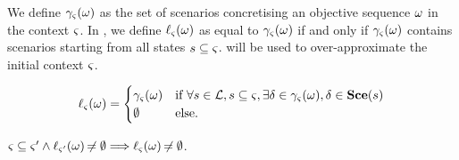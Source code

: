 We define $\gamma_\varsigma(\omega)$ as the set of scenarios concretising an objective sequence $\omega$ in the context $\varsigma$.
In , we define $\ell_\varsigma(\omega)$ as equal to $\gamma_\varsigma(\omega)$ if and only if $\gamma_\varsigma(\omega)$ contains scenarios starting from all states $s \subseteq \varsigma$.
 will be used to over-approximate the initial context $\varsigma$.
%
\begin{comment}
\begin{definition}[$\concr: \OS \mapsto \powerset(\Sce)$]
\label{def:concr}
\towrite{Simplifier ? Supprimer la def formelle ?}
  For a given $\w \in \OS$, $\concr(\w)$ is the set of scenarios concretising $\w$ in the context $\ctx$:
  \begin{align*}
    \concr(\w) = \{ \delta \in \Sce \mid & (\w^\vartriangle = \emptyseq \wedge \delta = \emptyseq) 
      \vee (\w^\vartriangle \neq \emptyseq \wedge \supp(\delta) \subseteq \ctx
    \\ &
      \wedge \exists \phi:\indexes{\w} \mapsto \indexes{\delta}, (\forall n, m \in \indexes{\w}, n < m \Leftrightarrow \phi(n) \leq \phi(m)) 
    \\ &
      \wedge \forall n \in \indexes{\w}, \PHbounce(\w_n) \in \ctx \PHplay \delta_{1..\phi(n)})
    \}
    \enspace,
  \end{align*}
  where $\omega^\vartriangle$ refers to the sequence of objectives $\omega$ where the trivial objectives have been removed.
\end{definition}
%
\begin{definition}[$\concr: \powerset(\OS) \mapsto \powerset(\Sce)$]
\label{def:concr-set}
  $\concr(\W) = \{ \delta \in \concr(\w) \mid \w \in \W \} \enspace.$
\end{definition}
\end{comment}
%
\begin{definition}[$\uconcr: \OS \mapsto \powerset(\Sce)$]
\label{def:uconcr}
  \[
  \ell_\varsigma(\omega) = 
  \begin{cases}
    \gamma_\varsigma(\omega) & \text{if } \forall s \in \mathcal{L}, s \subseteq \varsigma, \exists \delta \in \gamma_\varsigma(\omega), \delta \in \mathbf{Sce}(s) \\
    \emptyset & \text{else.}
  \end{cases}
  \]
\end{definition}
% 
\begin{theorem}
\label{th:uconcr-ctx}
  $\varsigma \subseteq \varsigma' \wedge \ell_{\varsigma'}(\omega) \not\nobreak\mkern -2mu = \emptyset \Longrightarrow \ell_{\varsigma}(\omega) \not\nobreak\mkern -2mu = \emptyset$.
\end{theorem}

